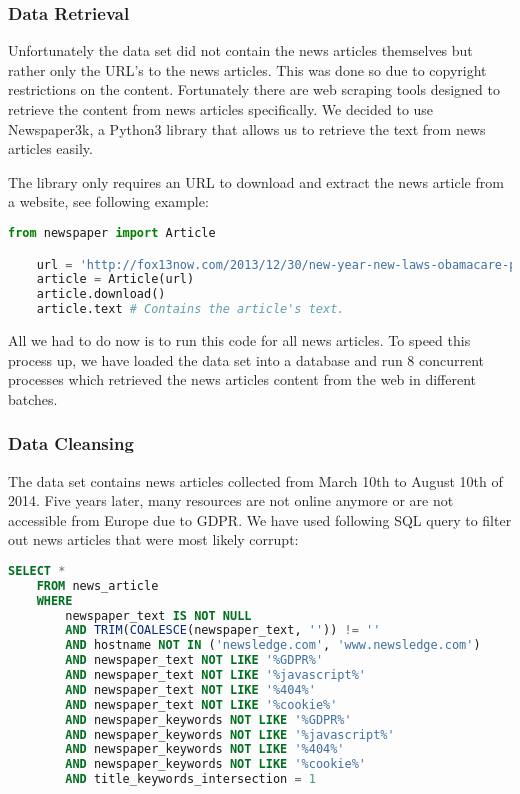 \subsubsection{Data Retrieval}
\label{subsubsec:4a_data_retrieval}

Unfortunately the data set did not contain the news articles themselves but rather only the URL's to the news articles.
This was done so due to copyright restrictions on the content.
Fortunately there are web scraping tools designed to retrieve the content from news articles specifically.
We decided to use Newspaper3k\cite{newspaper3k},
a Python3 library that allows us to retrieve the text from news articles easily.

The library only requires an URL to download and extract the news article from a website, see following example:

\begin{lstlisting}[language=Python, caption=Retrieve the news article from an URL., label={lst:newspaper3k_code}]
    from newspaper import Article

    url = 'http://fox13now.com/2013/12/30/new-year-new-laws-obamacare-pot-guns-and-drones/'
    article = Article(url)
    article.download()
    article.text # Contains the article's text.
\end{lstlisting}

All we had to do now is to run this code for all news articles.
To speed this process up, we have loaded the data set into a database and run 8 concurrent processes which
retrieved the news articles content from the web in different batches.

\subsubsection{Data Cleansing}
\label{subsubsec:4a_data_cleansing}

The data set contains news articles collected from March 10th to August 10th of 2014.
Five years later, many resources are not online anymore or are not accessible from Europe due to GDPR.
We have used following SQL query to filter out news articles that were most likely corrupt:

\begin{lstlisting}[language=SQL, caption=Retrieve valid news articles., label={lst:valid_news_articles_sql}]
    SELECT *
    FROM news_article
    WHERE
        newspaper_text IS NOT NULL
        AND TRIM(COALESCE(newspaper_text, '')) != ''
        AND hostname NOT IN ('newsledge.com', 'www.newsledge.com')
        AND newspaper_text NOT LIKE '%GDPR%'
        AND newspaper_text NOT LIKE '%javascript%'
        AND newspaper_text NOT LIKE '%404%'
        AND newspaper_text NOT LIKE '%cookie%'
        AND newspaper_keywords NOT LIKE '%GDPR%'
        AND newspaper_keywords NOT LIKE '%javascript%'
        AND newspaper_keywords NOT LIKE '%404%'
        AND newspaper_keywords NOT LIKE '%cookie%'
        AND title_keywords_intersection = 1
\end{lstlisting}



